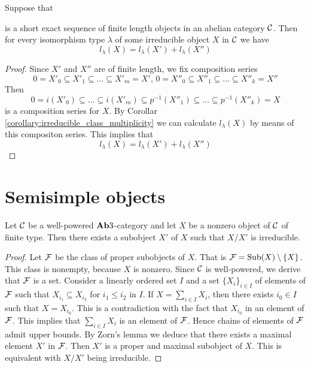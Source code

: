 \begin{proposition}\label{proposition:length_and_multipicity_as_morphism_from_Grothendieck_group}
Suppose that
\begin{center}
\end{center}
is a short exact sequence of finite length objects in an abelian category ${\mathcal C}$. Then for every isomorphism type $\lambda$ of some irreducible object $X$ in ${\mathcal C}$ we have
$$l_{\lambda}(X) = l_{\lambda}(X')+l_{\lambda}(X'')$$
\end{proposition}
\begin{proof}
Since $X'$ and $X''$ are of finite length, we fix composition series
$$0=X'_0 \subseteq X'_1\subseteq ...\subseteq X'_m = X',\,0= X''_0 \subseteq X''_1\subseteq ...\subseteq X''_k = X''$$
Then
$$0 = i(X'_0)\subseteq ...\subseteq i(X'_m)\subseteq p^{-1}(X''_1)\subseteq ...\subseteq p^{-1}(X''_k) = X$$
is a composition series for $X$. By Corollar \ref{corollary:irreducible_class_multiplicity} we can calculate $l_{\lambda}(X)$ by means of this compositon series. This implies that
$$l_{\lambda}(X) = l_{\lambda}(X')+l_{\lambda}(X'')$$
\end{proof}

\section{Semisimple objects}

\begin{proposition}\label{proposition:finite_type_objects_admit_maximal_proper_subobjects}
Let ${\mathcal C}$ be a well-powered $\mathbf{Ab}3$-category and let $X$ be a nonzero object of ${\mathcal C}$ of finite type. Then there exists a subobject $X'$ of $X$ such that $X/X'$ is irreducible.
\end{proposition}
\begin{proof}
Let ${\mathcal F}$ be the class of proper subobjects of $X$. That is ${\mathcal F} = \mathrm{Sub}(X)\setminus \{X\}$. This class is nonempty, because $X$ is nonzero. Since ${\mathcal C}$ is well-powered, we derive that ${\mathcal F}$ is a set. Consider a linearly ordered set $I$ and a set $\{X_i\}_{i\in I}$ of elements of ${\mathcal F}$ such that $X_{i_1}\subseteq X_{i_2}$ for $i_1\leq i_2$ in $I$. If $X = \sum_{i\in I}X_i$, then there exists $i_0\in I$ such that $X = X_{i_0}$. This is a contradiction with the fact that $X_{i_0}$ in an element of ${\mathcal F}$. This implies that $\sum_{i\in I}X_i$ is an element of ${\mathcal F}$. Hence chains of elements of ${\mathcal F}$ admit upper bounds. By Zorn's lemma we deduce that there exists a maximal element $X'$ in ${\mathcal F}$. Then $X'$ is a proper and maximal subobject of $X$. This is equivalent with $X/X'$ being irreducible.
\end{proof}

